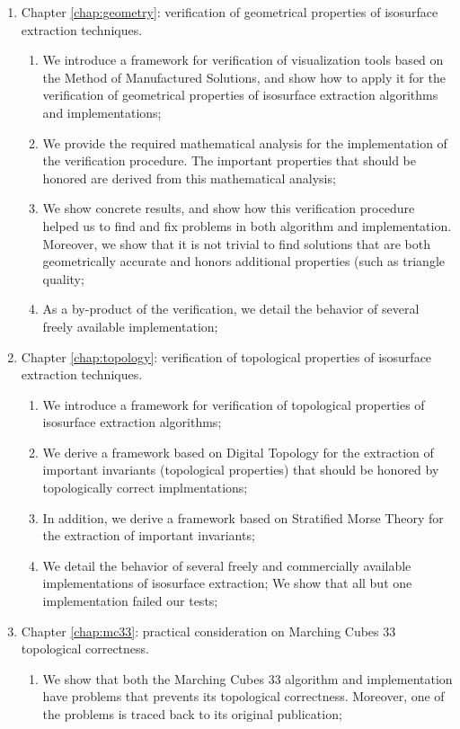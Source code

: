 \begin{enumerate}
\item Chapter \ref{chap:geometry}: verification of geometrical properties of isosurface extraction techniques.
\begin{enumerate}
\item We introduce a framework for verification of visualization tools based on the Method of Manufactured Solutions, and show how to apply it for the verification of geometrical properties of isosurface extraction algorithms and implementations;
\item We provide the required mathematical analysis for the implementation of the verification procedure. The important properties that should be honored are derived from this mathematical analysis;
\item We show concrete results, and show how this verification procedure helped us to find and fix problems in both algorithm and implementation. Moreover, we show that it is not trivial to find solutions that are both geometrically accurate and honors additional properties (such as triangle quality;
\item As a by-product of the verification, we detail the behavior of several freely available implementation;
\end{enumerate}
\item Chapter \ref{chap:topology}: verification of topological properties of isosurface extraction techniques.
\begin{enumerate}
\item We introduce a framework for verification of topological properties of isosurface extraction algorithms;
\item We derive a framework based on Digital Topology for the extraction of important invariants (topological properties) that should be honored by topologically correct implmentations;
\item In addition, we derive a framework based on Stratified Morse Theory for the extraction of important invariants;
\item We detail the behavior of several freely and commercially available implementations of isosurface extraction; We show that all but one implementation failed our tests;
\end{enumerate}
\item Chapter \ref{chap:mc33}: practical consideration on Marching Cubes 33 topological correctness.
\begin{enumerate}
\item We show that both the Marching Cubes 33 algorithm and implementation have problems that prevents its topological correctness. Moreover, one of the problems is traced back to its original publication;

\end{enumerate}
\end{enumerate}
